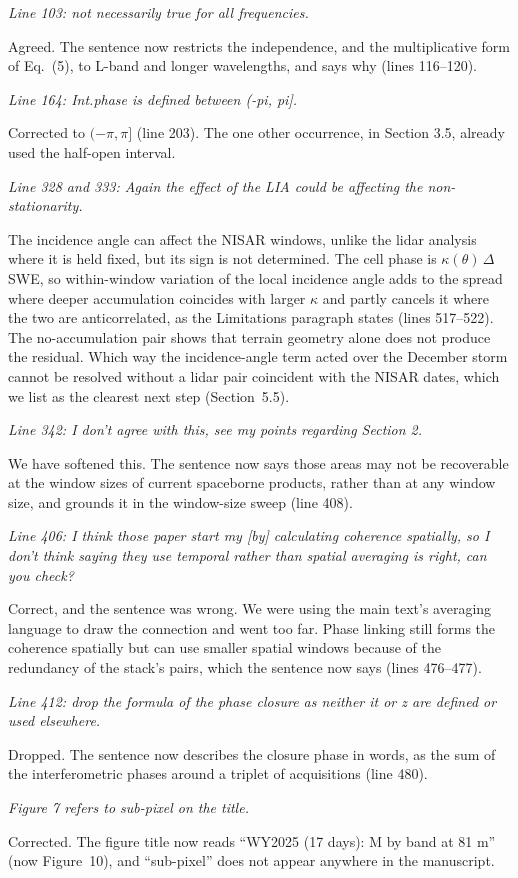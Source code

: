 \documentclass[tc, manuscript]{copernicus}
\begin{document}
\textit{Line 103: not necessarily true for all frequencies.}

Agreed. The sentence now restricts the independence, and the multiplicative form of Eq.~(5), to L-band and longer wavelengths, and says why (lines 116--120).

\textit{Line 164: Int.phase is defined between (-pi, pi].}

Corrected to $(-\pi, \pi]$ (line 203). The one other occurrence, in Section 3.5, already used the half-open interval.

\textit{Line 328 and 333: Again the effect of the LIA could be affecting the non-stationarity.}

The incidence angle can affect the NISAR windows, unlike the lidar analysis where it is held fixed, but its sign is not determined. The cell phase is $\kappa(\theta)\,\Delta$SWE, so within-window variation of the local incidence angle adds to the spread where deeper accumulation coincides with larger $\kappa$ and partly cancels it where the two are anticorrelated, as the Limitations paragraph states (lines 517--522). The no-accumulation pair shows that terrain geometry alone does not produce the residual. Which way the incidence-angle term acted over the December storm cannot be resolved without a lidar pair coincident with the NISAR dates, which we list as the clearest next step (Section~5.5).

\textit{Line 342: I don't agree with this, see my points regarding Section 2.}

We have softened this. The sentence now says those areas may not be recoverable at the window sizes of current spaceborne products, rather than at any window size, and grounds it in the window-size sweep (line 408).

\textit{Line 406: I think those paper start my [by] calculating coherence spatially, so I don't think saying they use temporal rather than spatial averaging is right, can you check?}

Correct, and the sentence was wrong. We were using the main text's averaging language to draw the connection and went too far. Phase linking still forms the coherence spatially but can use smaller spatial windows because of the redundancy of the stack's pairs, which the sentence now says (lines 476--477).

\textit{Line 412: drop the formula of the phase closure as neither it or z are defined or used elsewhere.}

Dropped. The sentence now describes the closure phase in words, as the sum of the interferometric phases around a triplet of acquisitions (line 480).

\textit{Figure 7 refers to sub-pixel on the title.}

Corrected. The figure title now reads ``WY2025 (17 days): M by band at 81 m'' (now Figure~10), and ``sub-pixel'' does not appear anywhere in the manuscript.
\end{document}
